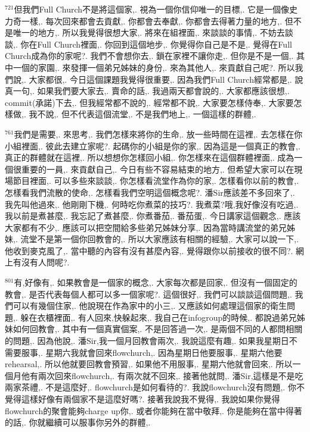 \documentclass{book}
\begin{document}
$^{721}$但我們Full Church不是將這個家,.
視為一個你信仰唯一的目標,.
它是一個像史力奇一樣,.
每次回來都會去貢獻,.
你都會去奉獻,.
你都會去得著力量的地方,.
但不是唯一的地方,.
所以我覺得很想大家,.
將來在組裡面,.
來談談的事情,.
不妨去談談,.
你在Full Church裡面,.
你回到這個地步,.
你覺得你自己是不是,.
覺得在Full Church成為你的家呢?.
我們不會想你去,.
鎖在家裡不讓你走,.
但你是不是一個,.
其中一個的家園,.
來發揮一個弟兄姊妹的身份,.
來為其他人,.
來貢獻自己呢?.
所以我們說,.
大家都很,.
今日這個課題我覺得很重要,.
因為我們Full Church經常都是,.
說真一句,.
如果我們要大家去,.
賣命的話,.
我過兩天都會說的,.
大家都應該很想,.
commit(承諾)下去,.
但我經常都不說的,.
經常都不說,.
大家要怎樣侍奉,.
大家要怎樣做,.
我不說,.
但不代表這個流堂,.
不是我們地上,.
一個這樣的群體,.

$^{761}$我們是需要,.
來思考,.
我們怎樣來將你的生命,.
放一些時間在這裡,.
去怎樣在你小組裡面,.
彼此去建立家呢?.
起碼你的小組是你的家,.
因為這是一個真正的教會,.
真正的群體就在這裡,.
所以想想你怎樣回小組,.
你怎樣來在這個群體裡面,.
成為一個很重要的一員,.
來貢獻自己,.
今日有些不容易結束的地方,.
但希望大家可以在現場節目裡面,.
可以多些來談談,.
你怎樣看流堂作為你的家,.
怎樣看你以前的教會,.
怎樣看我們流散的使命,.
怎樣看我們空明這個概念呢?.
潘Sir應該差不多回來了,.
我先叫他過來,.
他剛剛下機,.
何時吃你煮菜的技巧?.
我煮菜?哦,我好像沒有吃過,.
我以前是煮甚麼,.
我忘記了煮甚麼,.
你煮番茄,.
番茄蛋,.
今日講家這個觀念,.
應該大家都有不少,.
應該可以把空間給多些弟兄姊妹分享,.
因為當時講流堂的弟兄姊妹,.
流堂不是第一個你回教會的,.
所以大家應該有相關的經驗,.
大家可以說一下,.
他收到麥克風了,.
當中聽的內容有沒有甚麼內容,.
覺得跟你以前接收的很不同?.
網上有沒有人問呢?.

$^{801}$有,好像有,.
如果教會是一個家的概念,.
大家每次都是回家,.
但沒有一個固定的教會,.
是否代表每個人都可以多一個家呢?.
這個很好,.
我們可以談談這個問題,.
我們可以有幾個住家,.
他說現在作為家中的小三,.
又應該如何處理這個家的衛生問題,.
躲在衣櫃裡面,.
有人回來,快躲起來,.
我自己在infogroup的時候,.
都說過弟兄姊妹如何回教會,.
其中有一個真實個案,.
不是回答過一次,.
是兩個不同的人都問相關的問題,.
因為他說,.
潘Sir,我一個月回教會兩次,.
我說這麼有趣,.
如果我星期日不需要服事,.
星期六我就會回來flowchurch,.
因為星期日他要服事,.
星期六他要rehearsal,.
所以他就要回教會預習,.
如果他不用服事,.
星期六他就會回來,.
所以一個月他有兩次回來flowchurch,.
有兩次就不回來,.
接著他就問,.
潘Sir,這樣是不是吃兩家茶禮,.
不是這麼好,.
flowchurch是如何看待的?.
我說flowchurch沒有問題,.
你不覺得這樣好像有兩個家不是這麼好嗎?.
接著我說我不覺得,.
我說如果你覺得flowchurch的聚會能夠charge up你,.
或者你能夠在當中敬拜,.
你是能夠在當中得著的話,.
你就繼續可以服事你另外的群體,.
\end{document}
